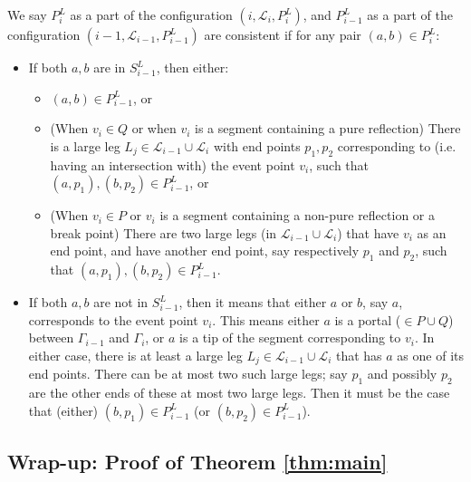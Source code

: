 \documentclass[10pt,a4paper]{amsart}
\theoremstyle{thmstyleone}
\begin{document}
	We say $ P^L_i $ as a part of the configuration $ (i, \mathcal L_i, P^L_i) $, and $ P^L_{i - 1} $ as a part of the configuration $ (i-1, \mathcal L_{i - 1}, P^L_{i - 1}) $ are consistent if for any pair $ (a, b)\in P^L_i $:
	\begin{itemize}
		\item If both $ a, b $ are in $ S_{i - 1}^L $, then either:
			\begin{itemize}
				\item $ (a, b) \in P^L_{i-1} $, or
				\item (When $ v_i \in Q $ or when $ v_i $ is a segment containing a pure reflection) There is a large leg $ L_j\in \mathcal L_{i - 1} \cup \mathcal L_{i} $ with end points $ p_1, p_2 $ corresponding to (i.e. having an intersection with) the event point $ v_i $,
					such that $ (a, p_1), (b, p_2)\in P^L_{i - 1} $, or
				\item (When $ v_i\in P $ or $ v_i $ is a segment containing a non-pure reflection or a break point)
				There are two large legs (in $ \mathcal L_{i - 1} \cup \mathcal L_{i} $) that have $ v_i $ as an end point, and have another end point, say respectively $ p_1 $ and $ p_2 $, such that  $ (a, p_1), (b, p_2)\in P^L_{i-1} $.
				
			\end{itemize}
		
		
		\item If both $ a, b $ are not in $ S_{i - 1}^L $, then it means that either $ a $ or $ b $, say $ a $, corresponds to the event point $ v_i $. This means either $ a $ is a portal ($ \in P\cup Q $) between $ \Gamma_{i-1} $ and $ \Gamma_i $, or $ a $ is a tip of the segment corresponding to $ v_i $. In either case, there is at least a large leg $ L_j \in \mathcal L_{i - 1} \cup \mathcal L_{i} $ that has $ a $ as one of its end points. There can be at most two such large legs; say $ p_1 $ and possibly $ p_2 $ are the other ends of these at most two large legs.
		Then 
		it must be the case that
		(either) $ (b, p_1) \in P^L_{i - 1} $ (or $ (b, p_2) \in P^L_{i - 1} $).
	\end{itemize}


\subsection{Wrap-up: Proof of Theorem \ref{thm:main}}\label{sec:main-theo-proof}
\end{document}
